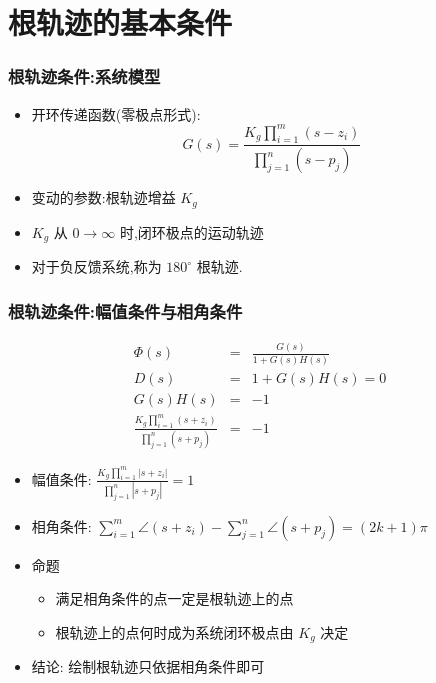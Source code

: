 \documentclass[table]{beamer}
\begin{document}
\section{根轨迹的基本条件}
\label{sec-2}
\begin{frame}
\frametitle{根轨迹条件:系统模型}
\label{sec-2-1}



\begin{itemize}
\item <2-> 开环传递函数(零极点形式):  
          \[G(s)=\frac{K_g\prod_{i=1}^m(s-z_i)}{\prod_{j=1}^n(s-p_j)}\]
\item <3-> 变动的参数:根轨迹增益  $K_g$
\item <4-> $K_g$ 从  $0\rightarrow\infty$  时,闭环极点的运动轨迹
\item <5-> 对于负反馈系统,称为  $180^\circ$  根轨迹.
\end{itemize}
\end{frame}
\begin{frame}
\frametitle{根轨迹条件:幅值条件与相角条件}
\label{sec-2-2}


\begin{eqnarray*}
\Phi(s) &=& \frac{G(s)}{1+G(s)H(s)} \\
D(s) &= &1+G(s)H(s) 
     = 0 \\
G(s)H(s) &=& -1 \\
\frac{K_g\prod_{i=1}^m(s+z_i)}{\prod_{j=1}^n(s+p_j)} &=& -1 
\end{eqnarray*}

\begin{itemize}
\item <2->幅值条件:  $\frac{K_g\prod_{i=1}^m|s+z_i|}{\prod_{j=1}^n|s+p_j|} = 1$
\item <3->相角条件:  $\sum_{i=1}^m\angle (s+z_i)-\sum_{j=1}^n\angle (s+p_j) = (2k+1)\pi$
\item <4->命题
\begin{itemize}
\item <4->满足相角条件的点一定是根轨迹上的点
\item <5->根轨迹上的点何时成为系统闭环极点由  $K_g$  决定
\end{itemize}
\item <6->结论: 绘制根轨迹只依据相角条件即可
\end{itemize}
\end{frame}
\end{document}
